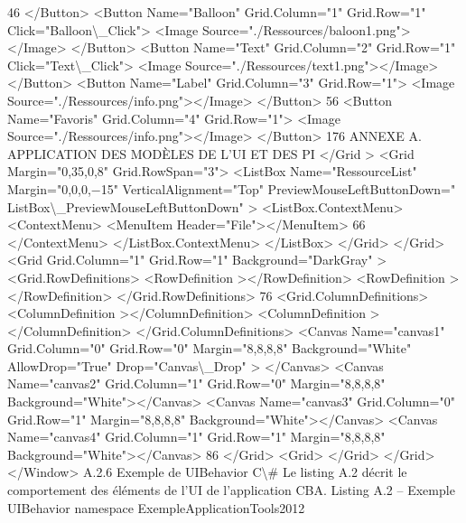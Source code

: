 \documentclass{article}
\begin{document}
46
</Button>
<Button Name="Balloon" Grid.Column="1" Grid.Row="1" Click="Balloon\textbackslash{}_Click">
<Image Source="./Ressources/baloon1.png"></Image>
</Button>
<Button Name="Text" Grid.Column="2" Grid.Row="1" Click="Text\textbackslash{}_Click">
<Image Source="./Ressources/text1.png"></Image>
</Button>
<Button Name="Label" Grid.Column="3" Grid.Row="1">
<Image Source="./Ressources/info.png"></Image>
</Button>
56
<Button Name="Favoris" Grid.Column="4" Grid.Row="1">
<Image Source="./Ressources/info.png"></Image>
</Button>
176
ANNEXE A. APPLICATION DES MODÈLES DE L’UI ET DES PI
</Grid >
<Grid Margin="0,35,0,8" Grid.RowSpan="3">
<ListBox Name="RessourceList" Margin="0,0,0,−15" VerticalAlignment="Top" PreviewMouseLeftButtonDown="
ListBox\textbackslash{}_PreviewMouseLeftButtonDown" >
<ListBox.ContextMenu>
<ContextMenu>
<MenuItem Header="File"></MenuItem>
66
</ContextMenu>
</ListBox.ContextMenu>
</ListBox>
</Grid>
</Grid>
<Grid Grid.Column="1" Grid.Row="1" Background="DarkGray" >
<Grid.RowDeﬁnitions>
<RowDeﬁnition ></RowDeﬁnition>
<RowDeﬁnition ></RowDeﬁnition>
</Grid.RowDeﬁnitions>
76
<Grid.ColumnDeﬁnitions>
<ColumnDeﬁnition ></ColumnDeﬁnition>
<ColumnDeﬁnition ></ColumnDeﬁnition>
</Grid.ColumnDeﬁnitions>
<Canvas Name="canvas1" Grid.Column="0" Grid.Row="0" Margin="8,8,8,8" Background="White" AllowDrop="True"
Drop="Canvas\textbackslash{}_Drop" >
</Canvas>
<Canvas Name="canvas2" Grid.Column="1" Grid.Row="0" Margin="8,8,8,8" Background="White"></Canvas>
<Canvas Name="canvas3" Grid.Column="0" Grid.Row="1" Margin="8,8,8,8" Background="White"></Canvas>
<Canvas Name="canvas4" Grid.Column="1" Grid.Row="1" Margin="8,8,8,8" Background="White"></Canvas>
86
</Grid>
<Grid>
</Grid>
</Grid>
</Window>
A.2.6
Exemple de UIBehavior C\textbackslash{}#
Le listing A.2 d\'{e}crit le comportement des \'{e}l\'{e}ments de l’UI de l’application CBA.
Listing A.2 – Exemple UIBehavior
namespace ExempleApplicationTools2012
\end{document}
